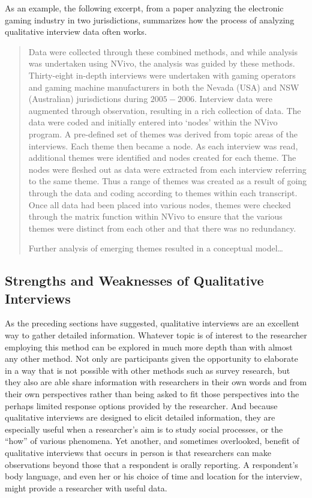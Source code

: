 As an example, the following excerpt, from a paper analyzing the electronic gaming industry in two jurisdictions\cite{buchanan2010efficacy}, summarizes how the process of analyzing qualitative interview data often works.

\begin{quote}
	Data were collected through these combined methods, and while analysis was undertaken using NVivo, the analysis was guided by these methods. Thirty-eight in-depth interviews were undertaken with gaming operators and gaming machine manufacturers in both the Nevada (USA) and NSW (Australian) jurisdictions during $ 2005-2006 $. Interview data were augmented through observation, resulting in a rich collection of data. The data were coded and initially entered into ‘nodes’ within the NVivo program. A pre-defined set of themes was derived from topic areas of the interviews. Each theme then became a node. As each interview was read, additional themes were identified and nodes created for each theme. The nodes were fleshed out as data were extracted from each interview referring to the same theme. Thus a range of themes was created as a result of going through the data and coding according to themes within each transcript. Once all data had been placed into various nodes, themes were checked through the matrix function within NVivo to ensure that the various themes were distinct from each other and that there was no redundancy. 
	
	Further analysis of emerging themes resulted in a conceptual model\ldots
\end{quote}

\subsection{Strengths and Weaknesses of Qualitative Interviews}

As the preceding sections have suggested, qualitative interviews are an excellent way to gather detailed information. Whatever topic is of interest to the researcher employing this method can be explored in much more depth than with almost any other method. Not only are participants given the opportunity to elaborate in a way that is not possible with other methods such as survey research, but they also are able share information with researchers in their own words and from their own perspectives rather than being asked to fit those perspectives into the perhaps limited response options provided by the researcher. And because qualitative interviews are designed to elicit detailed information, they are especially useful when a researcher’s aim is to study social processes, or the “how” of various phenomena. Yet another, and sometimes overlooked, benefit of qualitative interviews that occurs in person is that researchers can make observations beyond those that a respondent is orally reporting. A respondent’s body language, and even her or his choice of time and location for the interview, might provide a researcher with useful data.

